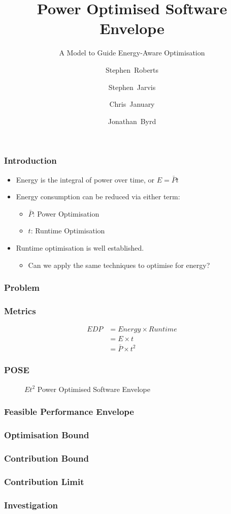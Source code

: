 \documentclass{beamer}
\title[POSE] %
{Power Optimised Software Envelope}
\subtitle{A Model to Guide Energy-Aware Optimisation}
\author[Roberts et al.] %
{Stephen~Roberts\inst{1} \and Stephen~Jarvis\inst{1} \\
 \and Chris~January\inst{1} \and Jonathan~Byrd\inst{2}}
\institute[Universities Here and There] %
{
    \inst{1}%
      Department of Computer Science\\
      The University of Warwick
    \and
      \inst{2}%
        Allinea Software
}
\begin{document}
  \frame{\titlepage}
  \begin{frame}
    \frametitle{Introduction}
    \begin{itemize}
      \item Energy is the integral of power over time, or $E = \bar{P}t$
      \item Energy consumption can be reduced via either term:
      \begin{itemize}
        \item $\bar{P}$: Power Optimisation
        \item $t$: Runtime Optimisation
      \end{itemize}
      \item Runtime optimisation is well established. 
      \begin{itemize}
        \item Can we apply the same techniques to optimise for energy? 
      \end{itemize}
    \end{itemize}
  \end{frame}
  
  \begin{frame}
    \frametitle{Problem}
  \end{frame}


  \begin{frame}
  \frametitle{Metrics}
  \begin{align}
    EDP &= Energy \times Runtime \nonumber \\
        &= E \times t \nonumber \\
        &= \bar{P} \times t^2
    \label{eq:edp}
  \end{align}
  \end{frame}

  \begin{frame}
    \frametitle{POSE}
    \begin{figure}
    \centering
    
    \caption{$Et^2$ Power Optimised Software Envelope}
    \label{fig:technique}
    \end{figure}
  \end{frame}
  \begin{frame}
    \frametitle{Feasible Performance Envelope}
  \end{frame}
  \begin{frame}
    \frametitle{Optimisation Bound}
  \end{frame}
  \begin{frame}
    \frametitle{Contribution Bound}
  \end{frame}
  \begin{frame}
    \frametitle{Contribution Limit}
  \end{frame}
  \begin{frame}
    \frametitle{Investigation}
  \end{frame}
\end{document}

